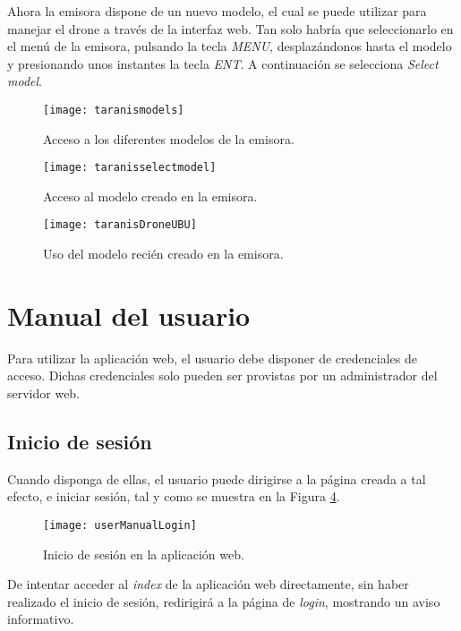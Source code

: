 Ahora la emisora dispone de un nuevo modelo, el cual se puede utilizar para manejar el drone a través de la interfaz web. Tan solo habría que seleccionarlo en el menú de la emisora, pulsando la tecla \emph{MENU}, desplazándonos hasta el modelo y presionando unos instantes la tecla \emph{ENT}. A continuación se selecciona \emph{Select model}.
\begin{figure}[H]
	\centering
	\texttt{[image: taranismodels]}
	\caption[Acceso a modelos de la emisora.]{Acceso a los diferentes modelos de la emisora.}\label{fig:taranismodels}
\end{figure}

\begin{figure}[H]
	\centering
	\texttt{[image: taranisselectmodel]}
	\caption[Acceso a modelo creado en la emisora.]{Acceso al modelo creado en la emisora.}\label{fig:taranisselectmodel}
\end{figure}

\begin{figure}[H]
	\centering
	\texttt{[image: taranisDroneUBU]}
	\caption[Uso de modelo creado en la emisora.]{Uso del modelo recién creado en la emisora.}\label{fig:taranisDroneUBU}
\end{figure}


\section{Manual del usuario}

Para utilizar la aplicación web, el usuario debe disponer de credenciales de acceso. Dichas credenciales solo pueden ser provistas por un administrador del servidor web. 

\subsection{Inicio de sesión}
\label{subsec:login}
Cuando disponga de ellas, el usuario puede dirigirse a la página creada a tal efecto, e iniciar sesión, tal y como se muestra en la Figura \ref{fig:userManualLogin}.


\begin{figure}[H]
	\centering
	\texttt{[image: userManualLogin]}
	\caption[Inicio de sesión en la aplicación web.]{Inicio de sesión en la aplicación web.}\label{fig:userManualLogin}
\end{figure}

De intentar acceder al \emph{index} de la aplicación web directamente, sin haber realizado el inicio de sesión, redirigirá a la página de \emph{login}, mostrando un aviso informativo.

